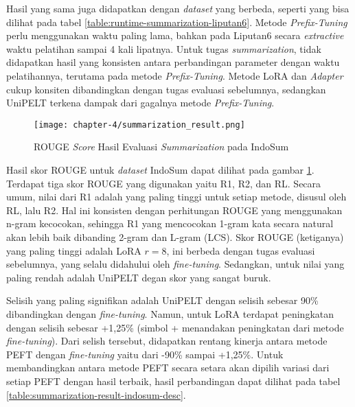Hasil yang sama juga didapatkan dengan \textit{dataset} yang berbeda, seperti yang bisa dilihat pada tabel \ref{table:runtime-summarization-liputan6}. Metode \textit{Prefix-Tuning} perlu menggunakan waktu paling lama, bahkan pada Liputan6 secara \textit{extractive} waktu pelatihan sampai 4 kali lipatnya. Untuk tugas \textit{summarization}, tidak didapatkan hasil yang konsisten antara perbandingan parameter dengan waktu pelatihannya, terutama pada metode \textit{Prefix-Tuning}. Metode LoRA dan \textit{Adapter} cukup konsiten dibandingkan dengan tugas evaluasi sebelumnya, sedangkan UniPELT terkena dampak dari gagalnya metode \textit{Prefix-Tuning}.

\begin{figure}[h]
    \centering
    \centerline{\texttt{[image: chapter-4/summarization\_result.png]}}
    \caption{ROUGE \textit{Score} Hasil Evaluasi \textit{Summarization} pada IndoSum}
    \label{fig:summarization-result-indosum}
\end{figure}

Hasil skor ROUGE untuk \textit{dataset} IndoSum dapat dilihat pada gambar \ref{fig:summarization-result-indosum}. Terdapat tiga skor ROUGE yang digunakan yaitu R1, R2, dan RL. Secara umum, nilai dari R1 adalah yang paling tinggi untuk setiap metode, disusul oleh RL, lalu R2. Hal ini konsisten dengan perhitungan ROUGE yang menggunakan n-gram kecocokan, sehingga R1 yang mencocokan 1-gram kata secara natural akan lebih baik dibanding 2-gram dan L-gram (LCS). Skor ROUGE (ketiganya) yang paling tinggi adalah LoRA $r=8$, ini berbeda dengan tugas evaluasi sebelumnya, yang selalu didahului oleh \textit{fine-tuning}. Sedangkan, untuk nilai yang paling rendah adalah UniPELT degan skor yang sangat buruk.

Selisih yang paling signifikan adalah UniPELT dengan selisih sebesar 90\% dibandingkan dengan \textit{fine-tuning}. Namun, untuk LoRA terdapat peningkatan dengan selisih sebesar +1,25\% (simbol + menandakan peningkatan dari metode \textit{fine-tuning}). Dari selish tersebut, didapatkan rentang kinerja antara metode PEFT dengan \textit{fine-tuning} yaitu dari -90\% sampai +1,25\%. Untuk membandingkan antara metode PEFT secara setara akan dipilih variasi dari setiap PEFT dengan hasil terbaik, hasil perbandingan dapat dilihat pada tabel \ref{table:summarization-result-indosum-desc}.

